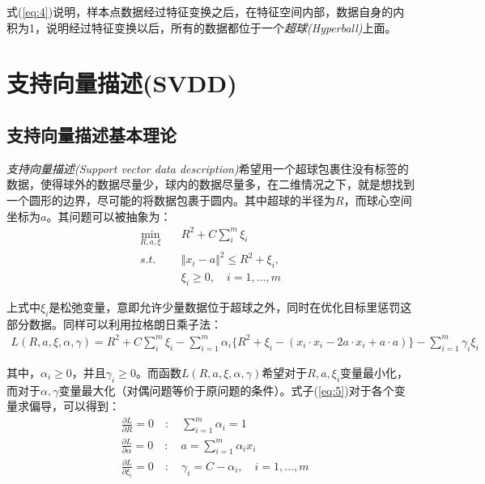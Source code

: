 \documentclass[UTF8, 12pt]{ctexart}
\begin{document}
式(\ref{eq:4})说明，样本点数据经过特征变换之后，在特征空间内部，数据自身的内积为1，说明经过特征变换以后，所有的数据都位于一个\emph{超球(Hyperball)}上面。

\section{支持向量描述(SVDD)}
\subsection{支持向量描述基本理论}
\emph{支持向量描述(Support vector data description)}希望用一个超球包裹住没有标签的数据，使得球外的数据尽量少，球内的数据尽量多，在二维情况之下，就是想找到一个圆形的边界，尽可能的将数据包裹于圆内。其中超球的半径为$R$，而球心空间坐标为$a$。其问题可以被抽象为：
\begin{align}
	\min_{R, a, \xi} & \quad R^{2} + C\sum_{i}^{m}\xi_{i} \\
	s.t. & \quad {\Vert x_{i} - a \Vert}^2 \leq R^{2}+\xi_{i}, \\
	     & \quad \xi_{i} \geq 0, \quad i = 1,...,m
\end{align}

上式中$\xi_{i}$是松弛变量，意即允许少量数据位于超球之外，同时在优化目标里惩罚这部分数据。同样可以利用拉格朗日乘子法：
\begin{align}
	\label{eq:5}
	 L(R,a,\xi,\alpha,\gamma) = R^{2} + C\sum_{i}^{m}\xi_{i} - \sum_{i=1}^{m}\alpha_{i} \{ R^{2} + \xi_{i} - (x_{i}·x_{i} - 2a·x_{i} + a·a)\} - \sum_{i=1}^{m}\gamma_{i}\xi_{i}
\end{align}

其中，$\alpha_{i} \geq 0$，并且$\gamma_{i} \geq 0$。而函数$L(R,a,\xi,\alpha,\gamma)$希望对于$R, a, \xi_{i}$变量最小化，而对于$\alpha, \gamma$变量最大化（对偶问题等价于原问题的条件）。式子(\ref{eq:5})对于各个变量求偏导，可以得到：
\begin{align}
	& \frac{\partial{L}}{\partial{R}} = 0 \quad : \quad \sum_{i=1}^{m}\alpha_{i} = 1\\
	\label{LinearCombination}
	& \frac{\partial{L}}{\partial{\alpha}} = 0 \quad : \quad a = \sum_{i=1}^{m}\alpha_{i}x_{i} \\
	\label{eq:6}
	& \frac{\partial{L}}{\partial{\xi_{i}}} = 0 \quad : \quad \gamma_{i} = C - \alpha_{i}, \quad i=1, ..., m
\end{align}
\end{document}
